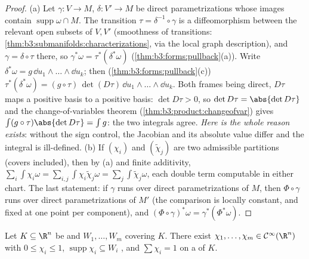 \begin{proof}
(a) Let $\gamma\colon V \to M$, $\delta\colon V' \to M$ be
direct parametrizations whose images contain
$\operatorname{supp}\omega\cap M$. The transition $\tau =
\delta^{-1}\circ\gamma$ is a diffeomorphism between the
relevant open subsets of $V, V'$ (smoothness of transitions:
\cref{thm:b3:submanifolds:characterizations}, via the local
graph description), and $\gamma = \delta\circ\tau$ there, so
$\gamma^*\omega = \tau^*(\delta^*\omega)$
(\cref{thm:b3:forms:pullback}(a)). Write $\delta^*\omega =
g\,\dd u_1\wedge\dots\wedge\dd u_k$; then
(\cref{thm:b3:forms:pullback}(c)) $\tau^*(\delta^*\omega) =
(g\circ\tau)\,\det(D\tau)\,\dd u_1\wedge\dots\wedge\dd u_k$.
Both frames being direct, $D\tau$ maps a positive basis to a
positive basis: $\det D\tau > 0$, so $\det D\tau =
\abs{\det D\tau}$ and the change-of-variables theorem
(\cref{thm:b3:product:changeofvar}) gives
$\int(g\circ\tau)\abs{\det D\tau} = \int g$: the two
integrals agree. \emph{Here is the whole reason 
exists}: without the sign control, the Jacobian and its
absolute value differ and the integral is ill-defined.
(b) If $(\chi_i)$ and $(\tilde\chi_j)$ are two admissible
partitions (covers included), then by (a) and finite
additivity, $\sum_i\int\chi_i\omega =
\sum_{i,j}\int\chi_i\tilde\chi_j\omega =
\sum_j\int\tilde\chi_j\omega$, each double term computable
in either chart. The last statement: if $\gamma$ runs over
direct parametrizations of $M$, then $\Phi\circ\gamma$ runs
over direct parametrizations of $M'$ (the 
comparison is locally constant, and fixed at one point per
component), and $(\Phi\circ\gamma)^*\omega =
\gamma^*(\Phi^*\omega)$.
\end{proof}

\begin{lemma}
\label{lem:b3:forms:partition}
Let $K \subseteq \R^n$ be  and $W_1, \dots, W_m$  covering $K$. There exist $\chi_1, \dots, \chi_m \in
\mathcal C^\infty(\R^n)$ with $0 \leq \chi_i \leq 1$,
$\operatorname{supp}\chi_i \subseteq W_i$ , and
$\sum\chi_i = 1$ on a  of
$K$.
\end{lemma}

